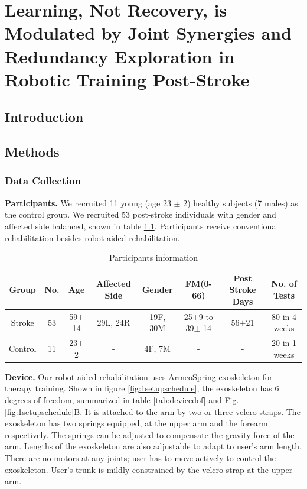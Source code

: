 \chapter{Learning, Not Recovery, is Modulated by Joint Synergies and Redundancy Exploration in Robotic Training Post-Stroke}
\label{cha:armeospring}



\section{Introduction}



\section{Methods}

\subsection{Data Collection}

\textbf{Participants.} 
We recruited 11 young (age 23 $\pm$ 2) healthy subjects (7 males) as the control group.
We recruited 53 post-stroke individuals with gender and affected side balanced, shown in table \ref{tab:demog}. 
Participants receive conventional rehabilitation besides robot-aided rehabilitation.

\begin{table}[b]
	\begin{tabular}{c c c c c c c c}
		\hline
		Group & No. & Age & Affected Side & Gender & FM(0-66) & Post Stroke Days & No. of Tests\\
		\hline
		Stroke & 53 & 59$\pm$14 & 29L, 24R & 19F, 30M & 25$\pm$9 to 39$\pm$ 14 & 56$\pm$21 & 80 in 4 weeks \\ 
		Control & 11 & 23$\pm$2 & - & 4F, 7M & - & - & 20 in 1 weeks \\
		\hline
	\end{tabular}
	\caption{Participants information}
	\label{tab:demog}
\end{table}

\textbf{Device.}
Our robot-aided rehabilitation uses ArmeoSpring exoskeleton \cite{} for therapy training. 
Shown in figure \ref{fig:1setupschedule}, the exoskeleton has 6 degrees of freedom, summarized in table \ref{tab:devicedof} and Fig. \ref{fig:1setupschedule}B. 
It is attached to the arm by two or three velcro straps. 
The exoskeleton has two springs equipped, at the upper arm and the forearm respectively. 
The springs can be adjusted to compensate the gravity force of the arm. 
Lengths of the exoskeleton are also adjustable to adapt to user's arm length.
There are no motors at any joints; user has to move actively to control the exoskeleton. 
User's trunk is mildly constrained by the velcro strap at the upper arm.


